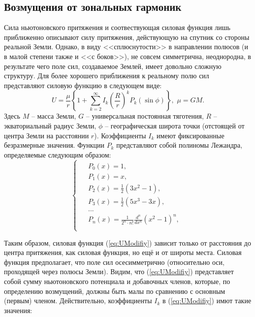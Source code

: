 \subsection{Возмущения от зональных гармоник}
\noindent\indent Сила ньютоновского притяжения и соотвествующая силовая функция
лишь приближенно описывают силу притяжения, действующую на спутник со стороны
реальной Земли. Однако, в виду <<сплюснутости>> в направлении полюсов (и в малой
степени также и <<с боков>>), не совсем симметрична, неоднородна, в результате
чего поле сил, создаваемое Землей, имеет довольно сложную структуру. Для более
хорошего приближения к реальному полю сил представляют силовую функцию в следующем виде:
\begin{equation} \label{eq:UModifiy}
  U = \frac{\mu}{r}\left\{1 + \sum\limits_{k=2}^{\infty}I_k\left(\frac{R}{r}\right)^kP_k(\sin\phi)\right\},\,\,
  \mu = GM.
\end{equation}
Здесь $M$ -- масса Земли, $G$ -- универсальная постоянная тяготения, $R$ -- экваториальный
радиус Земли, $\phi$ -- географическая широта точки (отстоящей от центра Земли на
расстоянии $r$). Коэффициенты $I_k$ имеют фиксированные безразмерные значения.
Функции $P_k$ представляют собой полиномы Лежандра, определяемые следующим образом:
\begin{equation}
  \begin{cases}
    \begin{aligned}
      & P_0(x) = 1, \\
      & P_1(x) = x, \\
      & P_2(x) = \frac{1}{2}(3x^2 - 1), \\
      & P_3(x) = \frac{1}{2}(5x^3 - 3x), \\
      & ...\\
      & P_n(x) = \frac{1}{2^n \cdot n!}\frac{d^n}{dx^n}(x^2 - 1)^n, \\
    \end{aligned}
  \end{cases}
\end{equation}\par
Таким образом, силовая функция (\ref{eq:UModifiy}) зависит только от расстояния
до центра притяжения, как силовая функция, но ещё и от широты места. Силовая
функция предполагает, что поле сил осесимметрично (относительно оси, проходящей
через полюсы Земли). Видим, что (\ref{eq:UModifiy}) представляет собой сумму
ньютоновского потенциала и добавочных членов, которые, по определению возмущений,
должны быть малы по сравнению с основным (первым) членом. Действительно,
коэффициенты $I_k$ в (\ref{eq:UModifiy}) имют такие значения:
